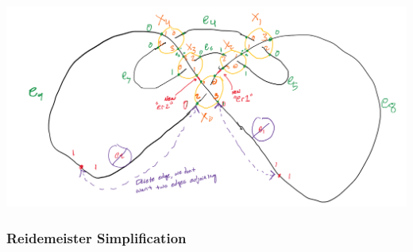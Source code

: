 \includegraphics[scale=0.5]{test_spatial_graph_diagrams/images/r3_after_move}


\subsubsection{Reidemeister Simplification}